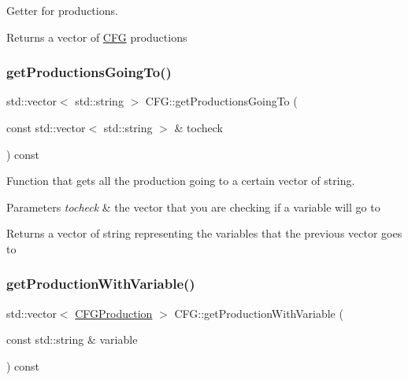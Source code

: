 Getter for productions. 

\begin{DoxyReturn}{Returns}
a vector of \hyperlink{classCFG}{C\+FG} productions 
\end{DoxyReturn}
\mbox{\label{classCFG_a49ffc508da502373b47a6294a1f0ca0b}} 
\subsubsection{\texorpdfstring{get\+Productions\+Going\+To()}{getProductionsGoingTo()}}
{\footnotesize\ttfamily std\+::vector$<$ std\+::string $>$ C\+F\+G\+::get\+Productions\+Going\+To (\begin{DoxyParamCaption}\item[{const std\+::vector$<$ std\+::string $>$ \&}]{tocheck }\end{DoxyParamCaption}) const}



Function that gets all the production going to a certain vector of string. 


\begin{DoxyParams}{Parameters}
{\em tocheck} & the vector that you are checking if a variable will go to \\
\hline
\end{DoxyParams}
\begin{DoxyReturn}{Returns}
a vector of string representing the variables that the previous vector goes to 
\end{DoxyReturn}
\mbox{\label{classCFG_abeb17f6d00f2f29f0765340e0f5a3fa7}} 
\subsubsection{\texorpdfstring{get\+Production\+With\+Variable()}{getProductionWithVariable()}}
{\footnotesize\ttfamily std\+::vector$<$ \hyperlink{classCFGProduction}{C\+F\+G\+Production} $>$ C\+F\+G\+::get\+Production\+With\+Variable (\begin{DoxyParamCaption}\item[{const std\+::string \&}]{variable }\end{DoxyParamCaption}) const}



